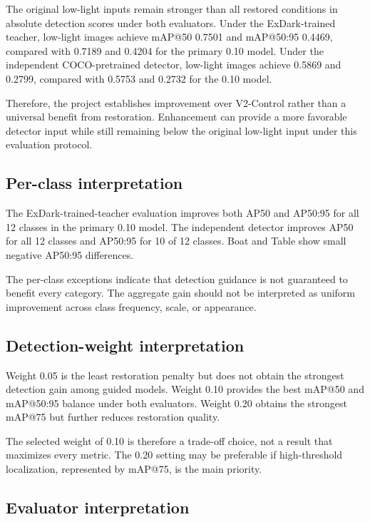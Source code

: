 The original low-light inputs remain stronger than all restored conditions
in absolute detection scores under both evaluators. Under the
ExDark-trained teacher, low-light images achieve mAP@50 0.7501 and
mAP@50:95 0.4469, compared with 0.7189 and 0.4204 for the primary 0.10
model. Under the independent COCO-pretrained detector, low-light images
achieve 0.5869 and 0.2799, compared with 0.5753 and 0.2732 for the 0.10
model.

Therefore, the project establishes improvement over V2-Control rather than
a universal benefit from restoration. Enhancement can provide a more
favorable detector input while still remaining below the original
low-light input under this evaluation protocol.

\subsection{Per-class interpretation}

The ExDark-trained-teacher evaluation improves both AP50 and AP50:95 for
all 12 classes in the primary 0.10 model. The independent detector
improves AP50 for all 12 classes and AP50:95 for 10 of 12 classes. Boat
and Table show small negative AP50:95 differences.

The per-class exceptions indicate that detection guidance is not guaranteed
to benefit every category. The aggregate gain should not be interpreted as
uniform improvement across class frequency, scale, or appearance.

\subsection{Detection-weight interpretation}

Weight 0.05 is the least restoration penalty but does not obtain the
strongest detection gain among guided models. Weight 0.10 provides the
best mAP@50 and mAP@50:95 balance under both evaluators. Weight 0.20
obtains the strongest mAP@75 but further reduces restoration quality.

The selected weight of 0.10 is therefore a trade-off choice, not a result
that maximizes every metric. The 0.20 setting may be preferable if
high-threshold localization, represented by mAP@75, is the main priority.

\subsection{Evaluator interpretation}


